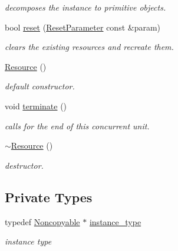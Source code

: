 \begin{DoxyCompactItemize}
\begin{DoxyCompactList}\small\item\em decomposes the instance to primitive objects. \end{DoxyCompactList}\item 
\hypertarget{classhryky_1_1thread_1_1_resource_a1456f170e50e126104346013f1436b51}{bool \hyperlink{classhryky_1_1thread_1_1_resource_a1456f170e50e126104346013f1436b51}{reset} (\hyperlink{structhryky_1_1thread_1_1_resource_1_1_reset_parameter}{Reset\-Parameter} const \&param)}\label{classhryky_1_1thread_1_1_resource_a1456f170e50e126104346013f1436b51}

\begin{DoxyCompactList}\small\item\em clears the existing resources and recreate them. \end{DoxyCompactList}\item 
\hyperlink{classhryky_1_1thread_1_1_resource_a1e7dce4836c5ff80cf23a14088bdb37a}{Resource} ()
\begin{DoxyCompactList}\small\item\em default constructor. \end{DoxyCompactList}\item 
void \hyperlink{classhryky_1_1thread_1_1_resource_a25c4d1b456f346f2ea386555a0856eac}{terminate} ()
\begin{DoxyCompactList}\small\item\em calls for the end of this concurrent unit. \end{DoxyCompactList}\item 
\hypertarget{classhryky_1_1thread_1_1_resource_a3cef78e4fd2ed458b741d9880805a611}{\hyperlink{classhryky_1_1thread_1_1_resource_a3cef78e4fd2ed458b741d9880805a611}{$\sim$\-Resource} ()}\label{classhryky_1_1thread_1_1_resource_a3cef78e4fd2ed458b741d9880805a611}

\begin{DoxyCompactList}\small\item\em destructor. \end{DoxyCompactList}\end{DoxyCompactItemize}
\subsection*{Private Types}
\begin{DoxyCompactItemize}
\item 
\hypertarget{classhryky_1_1_noncopyable_aaf87abb55f700af85ecb0895f6178821}{typedef \hyperlink{classhryky_1_1_noncopyable}{Noncopyable} $\ast$ \hyperlink{classhryky_1_1_noncopyable_aaf87abb55f700af85ecb0895f6178821}{instance\-\_\-type}}\label{classhryky_1_1_noncopyable_aaf87abb55f700af85ecb0895f6178821}

\begin{DoxyCompactList}\small\item\em instance type \end{DoxyCompactList}\end{DoxyCompactItemize}


